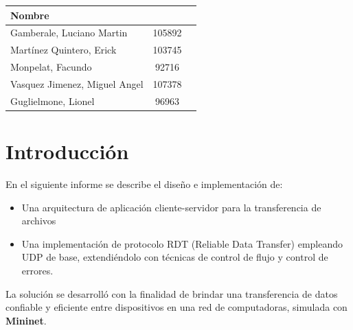 \documentclass[11pt,a4paper]{article}
\begin{document}
\begin{titlepage}
    \begin{tabular}{l c r}
    \hline
    \hline
    \large{Nombre} & \hspace{10mm}{Padrón} & 
    \hspace{10mm}{Mail}\\
    \hline
    \hline
    \large{Gamberale, Luciano Martin}&\hspace{10mm}105892 & \hspace{10mm}{lgamberale@fi.uba.ar}\\
    \large{Martínez Quintero, Erick} & \hspace{10mm}103745 &
    \hspace{10mm}{egmartinez@fi.uba.ar}\\
    \large{Monpelat, Facundo}&\hspace{10mm}92716 & \hspace{10mm}{fmonpelat@fi.uba.ar}\\
    \large{Vasquez Jimenez, Miguel Angel}&\hspace{10mm}107378 & \hspace{10mm}{mvasquezj@fi.uba.ar}\\
    \large{Guglielmone, Lionel}&\hspace{10mm}96963 & \hspace{10mm}{lguglielmone@fi.uba.ar}\\
    \hline
    \hline
\end{tabular}

\large{ }   


\vfill

\end{titlepage}
\tableofcontents
\newpage


\section{Introducción}

En el siguiente informe se describe el diseño e implementación de:

\begin{itemize}
    \item Una arquitectura de aplicación cliente-servidor para la transferencia de archivos
    \item Una implementación de protocolo RDT (Reliable Data Transfer) empleando UDP de base, extendiéndolo con técnicas de control de flujo y control de errores.  
\end{itemize}

La solución se desarrolló con la finalidad de brindar una transferencia de datos confiable y eficiente entre dispositivos en una red de computadoras, simulada con \textbf{Mininet}.
\end{document}
